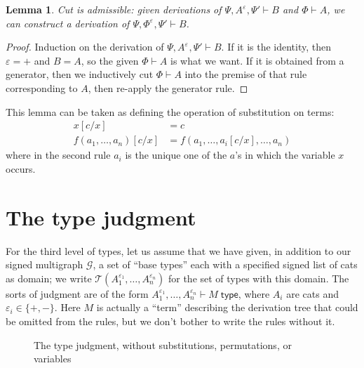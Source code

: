 \documentclass{amsart}
\let\types\vdash %
\def\p{^+} %
\def\m{^-}
\newcommand{\e}[1]{^{\varepsilon_{#1}}}
\newcommand{\ep}{\varepsilon}
\newcommand{\cG}{\ensuremath{\mathcal{G}}}
\newcommand{\cT}{\ensuremath{\mathcal{T}}}
\def\type{\;\mathsf{type}}
\def\flip#1{#1^*} %
\def\mor#1{\hom_{#1}}
\newcommand\combine{,}
\newcommand{\coend}{\begingroup\textstyle\int\endgroup}
\newcommand{\End}{\begingroup\textstyle\int\endgroup}
\newtheorem{lem}{Lemma}
\theoremstyle{definition}
\begin{document}
\begin{lem}
  Cut is admissible: given derivations of $\Psi,A\e{},\Psi' \types B$ and $\Phi\types A$, we can construct a derivation of $\Psi,\Phi\e{},\Psi'\types B$.
\end{lem}
\begin{proof}
  Induction on the derivation of $\Psi,A\e{},\Psi' \types B$.
  If it is the identity, then $\ep=+$ and $B=A$, so the given $\Phi\types A$ is what we want.
  If it is obtained from a generator, then we inductively cut $\Phi\types A$ into the premise of that rule corresponding to $A$, then re-apply the generator rule.
\end{proof}

This lemma can be taken as defining the operation of substitution on terms:
\begin{align*}
  x[c/x] &= c\\
  f(a_1,\dots,a_n)[c/x] &= f(a_1,\dots,a_i[c/x],\dots,a_n)
\end{align*}
where in the second rule $a_i$ is the unique one of the $a$'s in which the variable $x$ occurs.


\section{The type judgment}
\label{sec:type-judgment}

For the third level of types, let us assume that we have given, in addition to our signed multigraph $\cG$, a set of ``base types'' each with a specified signed list of cats as domain; we write $\cT(A_1\e1,\dots,A_n\e n)$ for the set of types with this domain.
The sorts of judgment are of the form $A_1\e1,\dots, A_n\e n \types M\type$, where $A_i$ are cats and $\ep_i\in\{+,-\}$.
Here $M$ is actually a ``term'' describing the derivation tree that could be omitted from the rules, but we don't bother to write the rules without it.

\begin{figure}
  \centering
  \caption{The type judgment, without substitutions, permutations, or variables}
  \label{fig:type-nosub}
\end{figure}
\end{document}
